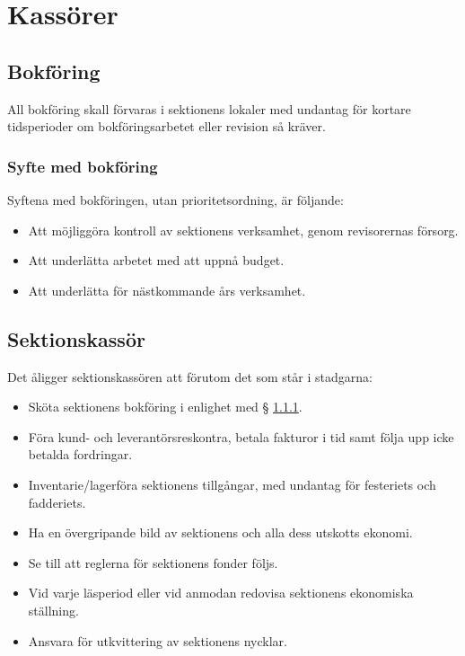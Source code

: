 \documentclass{datateknologsektionen-document}
\begin{document}
\section{Kassörer}
\subsection{Bokföring}
All bokföring skall förvaras i sektionens lokaler med undantag för kortare tidsperioder om bokföringsarbetet eller revision så kräver.
\subsubsection{Syfte med bokföring}
\label{bokforingssyfte}
Syftena med bokföringen, utan prioritetsordning, är följande:
\begin{itemize}
  \item Att möjliggöra kontroll av sektionens verksamhet, genom revisorernas försorg.
  \item Att underlätta arbetet med att uppnå budget.
  \item Att underlätta för nästkommande års verksamhet.
\end{itemize}
\subsection{Sektionskassör}
\label{sektionskassor}
Det åligger sektionskassören att förutom det som står i stadgarna:
\begin{itemize}
  \item Sköta sektionens bokföring i enlighet med § \ref{bokforingssyfte}.
  \item Föra kund- och leverantörsreskontra, betala fakturor i tid samt följa upp icke betalda fordringar.
  \item Inventarie/lagerföra sektionens tillgångar, med undantag för festeriets och fadderiets.
  \item Ha en övergripande bild av sektionens och alla dess utskotts ekonomi.
  \item Se till att reglerna för sektionens fonder följs.
  \item Vid varje läsperiod eller vid anmodan redovisa sektionens ekonomiska ställning.
  \item Ansvara för utkvittering av sektionens nycklar.
\end{itemize}
\end{document}
